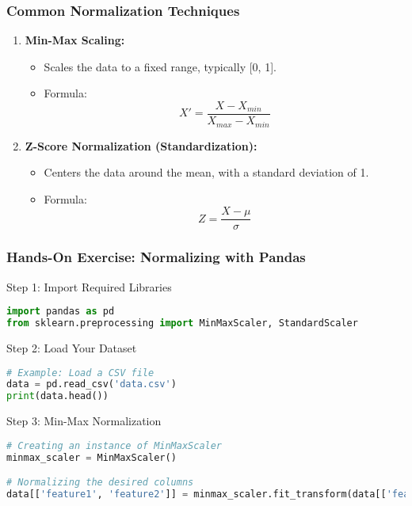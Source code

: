 \documentclass[aspectratio=169]{beamer}
\begin{document}
\begin{frame}[fragile]
    \frametitle{Common Normalization Techniques}
    \begin{enumerate}
        \item \textbf{Min-Max Scaling:}
            \begin{itemize}
                \item Scales the data to a fixed range, typically [0, 1].
                \item Formula: 
                \begin{equation}
                X' = \frac{X - X_{min}}{X_{max} - X_{min}}
                \end{equation}
            \end{itemize}
    
        \item \textbf{Z-Score Normalization (Standardization):}
            \begin{itemize}
                \item Centers the data around the mean, with a standard deviation of 1.
                \item Formula: 
                \begin{equation}
                Z = \frac{X - \mu}{\sigma}
                \end{equation}
                  \mu {} \sigma {}
            \end{itemize}
    \end{enumerate}
\end{frame}

\begin{frame}[fragile]
    \frametitle{Hands-On Exercise: Normalizing with Pandas}
    \begin{block}{Step 1: Import Required Libraries}
    \begin{lstlisting}[language=Python]
import pandas as pd
from sklearn.preprocessing import MinMaxScaler, StandardScaler
    \end{lstlisting}
    \end{block}
    
    \begin{block}{Step 2: Load Your Dataset}
    \begin{lstlisting}[language=Python]
# Example: Load a CSV file
data = pd.read_csv('data.csv')
print(data.head())
    \end{lstlisting}
    \end{block}
    
    \begin{block}{Step 3: Min-Max Normalization}
    \begin{lstlisting}[language=Python]
# Creating an instance of MinMaxScaler
minmax_scaler = MinMaxScaler()

# Normalizing the desired columns
data[['feature1', 'feature2']] = minmax_scaler.fit_transform(data[['feature1', 'feature2']])
    \end{lstlisting}
    \end{block}
\end{frame}
\end{document}
